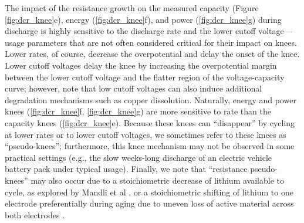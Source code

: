 \documentclass[journal=jpclcd,manuscript=article]{achemso}
\begin{document}
The impact of the resistance growth on the measured capacity (Figure \ref{fig:dcr_knee}e), energy (\ref{fig:dcr_knee}f), and power (\ref{fig:dcr_knee}g) during discharge is highly sensitive to the discharge rate and the lower cutoff voltage---usage parameters that are not often considered critical for their impact on knees. Lower rates, of course, decrease the overpotential and delay the onset of the knee. Lower cutoff voltages delay the knee by increasing the overpotential margin between the lower cutoff voltage and the flatter region of the voltage-capacity curve; however, note that low cutoff voltages can also induce additional degradation mechanisms such as copper dissolution\cite{fear_elucidating_2018, carter_x-ray_2018}. Naturally, energy and power knees (\ref{fig:dcr_knee}f, \ref{fig:dcr_knee}g) are more sensitive to rate than the capacity knees (\ref{fig:dcr_knee}e). Because these knees can ``disappear'' by cycling at lower rates or to lower cutoff voltages, we sometimes refer to these knees as ``pseudo-knees''; furthermore, this knee mechanism may not be observed in some practical settings (e.g., the slow weeks-long discharge of an electric vehicle battery pack under typical usage).
Finally, we note that ``resistance pseudo-knees'' may also occur due to a stoichiometric decrease of lithium available to cycle, as explored by Mandli et al \cite{mandli_analysis_2019}, or a stoichiometric shifting of lithium to one electrode preferentially during aging due to uneven loss of active material across both electrodes \cite{lin_comprehensive_2013}.
\end{document}
